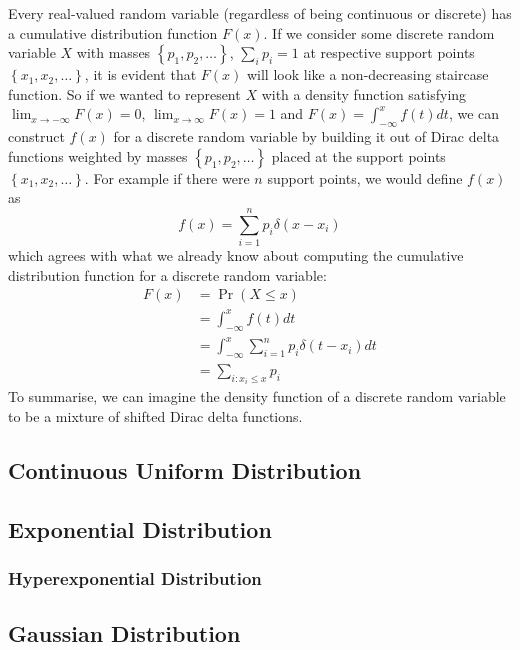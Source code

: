 \documentclass[11pt]{report} %
\begin{document}
Every real-valued random variable (regardless of being continuous or discrete) has a cumulative distribution function $F\left(x\right)$. If we consider some discrete random variable $X$ with masses $\left\{p_{1}, p_{2}, \dots\right\}$, $\sum_{i}p_{i} = 1$ at respective support points $\left\{x_{1}, x_{2}, \dots\right\}$, it is evident that $F\left(x\right)$ will look like a non-decreasing staircase function. So if we wanted to represent $X$ with a density function satisfying $\lim_{x\to-\infty}F\left(x\right) = 0$, $\lim_{x\to\infty}F\left(x\right) = 1$ and $F\left(x\right) = \int_{-\infty}^{x}f\left(t\right)dt$, we can construct $f\left(x\right)$ for a discrete random variable by building it out of Dirac delta functions weighted by masses $\left\{p_{1}, p_{2}, \dots\right\}$ placed at the support points $\left\{x_{1}, x_{2}, \dots\right\}$. For example if there were $n$ support points, we would define $f\left(x\right)$ as
\begin{equation}
f\left(x\right) = \sum_{i = 1}^{n}p_{i}\delta\left(x - x_{i}\right)
\end{equation}
which agrees with what we already know about computing the cumulative distribution function for a discrete random variable:
\begin{align} F\left(x\right) &= \operatorname{Pr}\left(X \leq x\right) \\
&= \int_{-\infty}^{x}f\left(t\right)dt \\
&= \int_{-\infty}^{x}\sum_{i = 1}^{n}p_{i}\delta\left(t - x_{i}\right)dt \\
&= \sum_{i: x_{i} \leq x}p_{i}
\end{align}
To summarise, we can imagine the density function of a discrete random variable to be a mixture of shifted Dirac delta functions.

\subsection{Continuous Uniform Distribution}

\subsection{Exponential Distribution}

\subsubsection{Hyperexponential Distribution}

\subsection{Gaussian Distribution}
\end{document}
